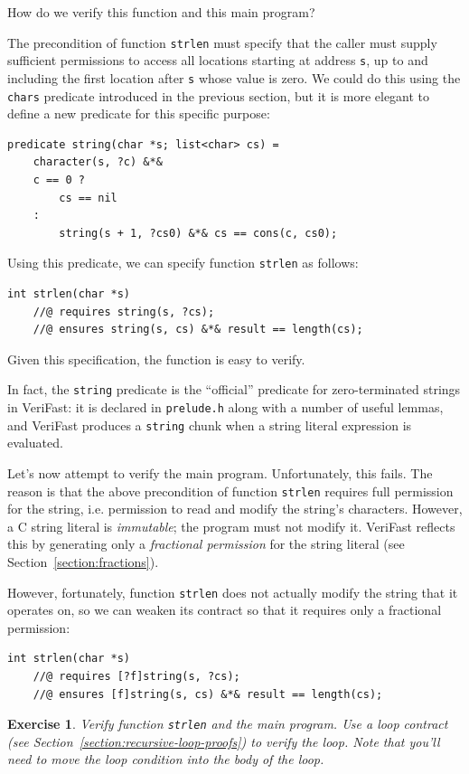 \documentclass{article}
\newtheorem{exercise}{Exercise}
\begin{document}
How do we verify this function and this main program?

The precondition of function \lstinline!strlen! must specify
that the caller must supply sufficient permissions to access
all locations starting at address \lstinline!s!, up to and
including the first location after \lstinline!s! whose value is
zero. We could do this using the \lstinline!chars! predicate
introduced in the previous section, but it is more elegant to
define a new predicate for this specific purpose:
\begin{lstlisting}
predicate string(char *s; list<char> cs) =
    character(s, ?c) &*&
    c == 0 ?
        cs == nil
    :
        string(s + 1, ?cs0) &*& cs == cons(c, cs0);
\end{lstlisting}
Using this predicate, we can specify function \lstinline!strlen! as follows:
\begin{lstlisting}
int strlen(char *s)
    //@ requires string(s, ?cs);
    //@ ensures string(s, cs) &*& result == length(cs);
\end{lstlisting}
Given this specification, the function is easy to verify.

In fact, the \lstinline|string| predicate is the ``official''
predicate for zero-terminated strings in VeriFast: it is
declared in \lstinline|prelude.h| along with a number of useful
lemmas, and VeriFast produces a \lstinline|string| chunk when a
string literal expression is evaluated.

Let's now attempt to verify the main program. Unfortunately,
this fails. The reason is that the above precondition of
function \lstinline!strlen! requires full permission for the
string, i.e. permission to read and modify the string's
characters. However, a C string literal is \emph{immutable};
the program must not modify it. VeriFast reflects this by
generating only a \emph{fractional permission} for the string
literal (see Section~\ref{section:fractions}).

However, fortunately, function \lstinline!strlen! does not
actually modify the string that it operates on, so we can
weaken its contract so that it requires only a fractional
permission:
\begin{lstlisting}
int strlen(char *s)
    //@ requires [?f]string(s, ?cs);
    //@ ensures [f]string(s, cs) &*& result == length(cs);
\end{lstlisting}

\begin{exercise}\label{exercise:strlen}
Verify function \lstinline!strlen! and the main program. Use a
loop contract (see Section~\ref{section:recursive-loop-proofs})
to verify the loop. Note that you'll need to move the loop
condition into the body of the loop.
\end{exercise}
\end{document}
